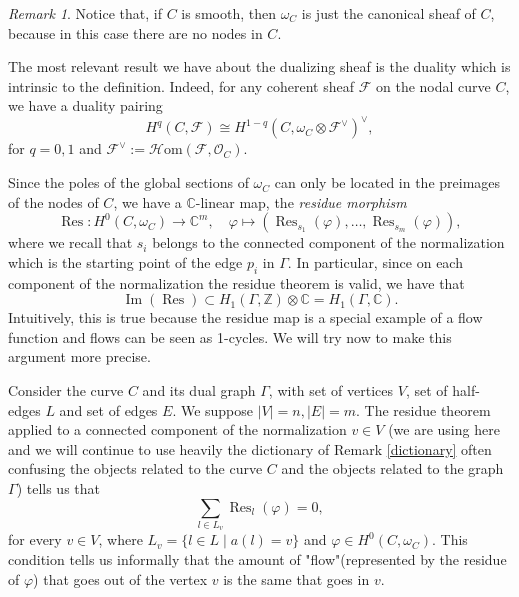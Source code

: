 \documentclass[a4paper,12 pt,titlepage,twoside]{book}
\newcommand{\numberset}{\mathbb}
\newcommand{\Z}{\numberset{Z}}
\newcommand{\C}{\numberset{C}}
\newcommand{\os}{\mathcal{O}}
\DeclareMathOperator{\Ima}{Im}
\DeclareMathOperator{\res}{Res}
\theoremstyle{plain}
\theoremstyle{theorem}
\theoremstyle{definition}
\theoremstyle{remark}
\newtheorem{oss}[thm]{Remark}
\begin{document}
	\begin{oss}
		Notice that, if $C$ is smooth, then $\omega_C$ is just the canonical sheaf of $C$, because in this case there are no nodes in $C$.
	\end{oss}
	The most relevant result we have about the dualizing sheaf is the duality which is intrinsic to the definition. Indeed, for any coherent sheaf $\mathcal{F}$ on the nodal curve $C$, we have a duality pairing \begin{equation}\label{eq: Serre duality}
	H^q(C,\mathcal{F}) \cong H^{1-q}(C, \omega_C \otimes \mathcal{F}^\vee)^\vee,
	\end{equation} for $q=0,1$ and $\mathcal{F}^\vee := \mathcal{H}\text{om}(\mathcal{F}, \os_C).$\newline
	
	Since the poles of the global sections of $\omega_C$ can only be located in the preimages of the nodes of $C$, we have a $\C$-linear map, the \emph{residue morphism} $$\res \colon H^0(C,\omega_C) \rightarrow \C^m, \quad \varphi \mapsto \left(\res_{s_1}(\varphi), \dots, \res_{s_m}(\varphi)\right),$$ where we recall that $s_i$ belongs to the connected component of the normalization which is the starting point of the edge $p_i$ in $\Gamma.$ In particular, since on each component of the normalization the residue theorem is valid, we have that $$\Ima(\res) \subset H_1(\Gamma, \Z) \otimes \C = H_1(\Gamma,\C).$$ 
	Intuitively, this is true because the residue map is a special example of a flow function and flows can be seen as 1-cycles. We will try now to make this argument more precise.
	
	Consider the curve $C$ and its dual graph $\Gamma$, with set of vertices $V$, set of half-edges $L$ and set of edges $E$. We suppose $|V|=n, |E|=m.$
	The residue theorem applied to a connected component of the normalization $v \in V$ (we are using here and we will continue to use heavily the dictionary of Remark \ref{dictionary} often confusing the objects related to the curve $C$ and the objects related to the graph $\Gamma$) tells us that $$\sum_{l \in L_v} \res_l (\varphi) =0,$$ for every $v \in V$, where $L_v = \{l \in L \mid a(l)=v\}$ and $ \varphi \in H^0(C, \omega_C)$. This condition tells us informally that the amount of "flow"(represented by the residue of $\varphi$) that goes out of the vertex $v$ is the same that goes in $v$.
	
\end{document}

